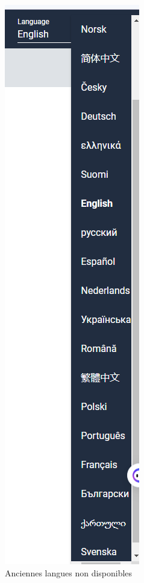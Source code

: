 \begin{figure}[H]
\centering
\begin{minipage}{.5\textwidth}
  \centering
  \includegraphics[width=.4\linewidth]{schémas/blangue.png}
  \caption{Anciennes langues non disponibles}
  \label{blangue}
\end{minipage}%
\begin{minipage}{.5\textwidth}
  \centering

\end{minipage}
\end{figure}
